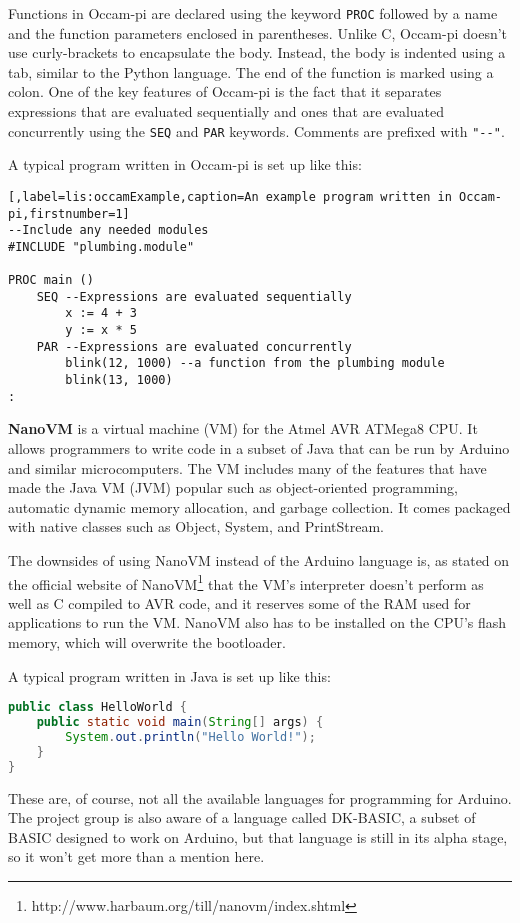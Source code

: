 Functions in Occam-pi are declared using the keyword \texttt{PROC} followed by a name and the function parameters enclosed in parentheses.
Unlike C, Occam-pi doesn't use curly-brackets to encapsulate the body.
Instead, the body is indented using a tab, similar to the Python language.
The end of the function is marked using a colon.
One of the key features of Occam-pi is the fact that it separates expressions that are evaluated sequentially and ones that are evaluated concurrently using the \texttt{SEQ} and \texttt{PAR} keywords.
Comments are prefixed with \texttt{"{-}{-}"}.

A typical program written in Occam-pi is set up like this:

\begin{lstlisting}[,label=lis:occamExample,caption=An example program written in Occam-pi,firstnumber=1]
--Include any needed modules
#INCLUDE "plumbing.module"

PROC main ()
	SEQ --Expressions are evaluated sequentially
		x := 4 + 3
		y := x * 5
	PAR --Expressions are evaluated concurrently
		blink(12, 1000) --a function from the plumbing module
		blink(13, 1000)
:
\end{lstlisting}

\textbf{NanoVM} is a virtual machine (VM) for the Atmel AVR ATMega8 CPU.
It allows programmers to write code in a subset of Java that can be run by Arduino and similar microcomputers.
The VM includes many of the features that have made the Java VM (JVM) popular such as object-oriented programming, automatic dynamic memory allocation, and garbage collection.
It comes packaged with native classes such as Object, System, and PrintStream.

The downsides of using NanoVM instead of the Arduino language is, as stated on the official website of NanoVM\footnote{http://www.harbaum.org/till/nanovm/index.shtml} that the VM's interpreter doesn't perform as well as C compiled to AVR code, and it reserves some of the RAM used for applications to run the VM.
NanoVM also has to be installed on the CPU's flash memory, which will overwrite the bootloader.

A typical program written in Java is set up like this:
\begin{lstlisting}[language=Java,label=lis:javaExample,caption=An example program written in Java,firstnumber=1]
public class HelloWorld {
	public static void main(String[] args) {
		System.out.println("Hello World!");
	}
}
\end{lstlisting}

These are, of course, not all the available languages for programming for Arduino.
The project group is also aware of a language called DK-BASIC, a subset of BASIC designed to work on Arduino, but that language is still in its alpha stage, so it won't get more than a mention here.
